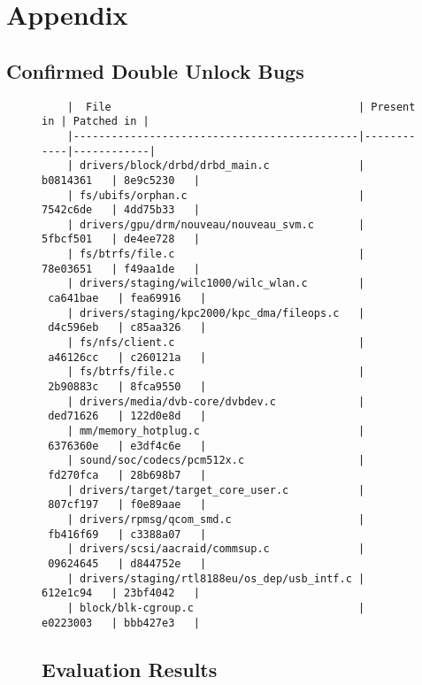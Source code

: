 \section{Appendix}
\subsection{Confirmed Double Unlock Bugs}

\begin{figure}[H]
    \begin{verbatim}
    |  File                                       | Present in | Patched in |
    |---------------------------------------------|------------|------------|
    | drivers/block/drbd/drbd_main.c              | b0814361   | 8e9c5230   |
    | fs/ubifs/orphan.c                           | 7542c6de   | 4dd75b33   | 
    | drivers/gpu/drm/nouveau/nouveau_svm.c       | 5fbcf501   | de4ee728   |
    | fs/btrfs/file.c                             | 78e03651   | f49aa1de   |
    | drivers/staging/wilc1000/wilc_wlan.c        | ca641bae   | fea69916   |
    | drivers/staging/kpc2000/kpc_dma/fileops.c   | d4c596eb   | c85aa326   |
    | fs/nfs/client.c                             | a46126cc   | c260121a   |
    | fs/btrfs/file.c                             | 2b90883c   | 8fca9550   |
    | drivers/media/dvb-core/dvbdev.c             | ded71626   | 122d0e8d   |
    | mm/memory_hotplug.c                         | 6376360e   | e3df4c6e   |
    | sound/soc/codecs/pcm512x.c                  | fd270fca   | 28b698b7   |
    | drivers/target/target_core_user.c           | 807cf197   | f0e89aae   |
    | drivers/rpmsg/qcom_smd.c                    | fb416f69   | c3388a07   |
    | drivers/scsi/aacraid/commsup.c              | 09624645   | d844752e   |
    | drivers/staging/rtl8188eu/os_dep/usb_intf.c | 612e1c94   | 23bf4042   |
    | block/blk-cgroup.c                          | e0223003   | bbb427e3   |
    \end{verbatim}

    \subsection{Evaluation Results}


\end{figure}
